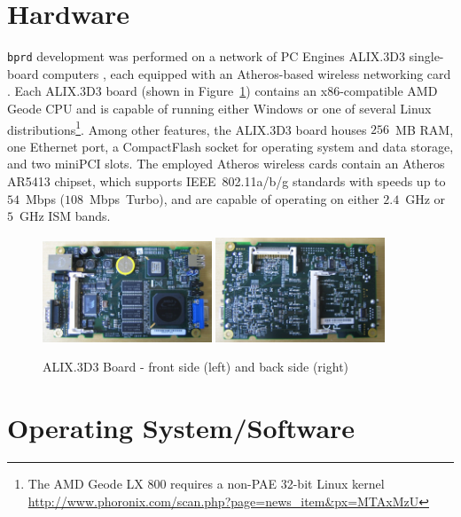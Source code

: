 \documentclass{article}
\newcommand{\bprd}{\texttt{bprd}\xspace}
\begin{document}
\section{Hardware}\label{sec:hardware}

\bprd development was performed on a network of PC Engines ALIX.3D3 single-board computers \cite{alix3d3}, each equipped with an Atheros-based wireless networking card \cite{dcma82}.
Each ALIX.3D3 board (shown in Figure~\ref{fig:alix3d3-board}) contains an x86-compatible AMD Geode CPU and is capable of running either Windows or one of several Linux distributions\footnote{The AMD Geode LX 800 requires a non-PAE 32-bit Linux kernel \url{http://www.phoronix.com/scan.php?page=news_item&px=MTAxMzU}}.
Among other features, the ALIX.3D3 board houses \(256\)~MB RAM, one Ethernet port, a CompactFlash socket for operating system and data storage, and two miniPCI slots.
The employed Atheros wireless cards contain an Atheros AR5413 chipset, which supports IEEE~802.11a/b/g standards with speeds up to \(54\)~Mbps (\(108\)~Mbps~Turbo), and are capable of operating on either \(2.4\)~GHz or \(5\)~GHz ISM bands.

\begin{figure}[!ht]
\centering
\null\hfill%
\includegraphics[width=0.45\textwidth]{img/alix3d3.jpg}%
\hfill%
\includegraphics[width=0.45\textwidth]{img/alix3d3b.jpg}%
\hfill\null%
\caption{ALIX.3D3 Board - front side (left) and back side (right) \cite{alix3d3}}
\label{fig:alix3d3-board}
\end{figure}

\section{Operating System/Software}\label{sec:software}
\end{document}
